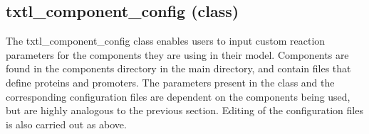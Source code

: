\documentclass[english]{report}
\begin{document}
		
		
		\subsection*{txtl\_component\_config (class)}	
		The txtl\_component\_config class enables users to input custom reaction parameters for the components they are using in their model. Components are found in the \textsf{components} directory in the main directory, and contain files that define proteins and promoters. The parameters present in the class and the corresponding configuration files are dependent on the components being used, but are highly analogous to the previous section. Editing of the configuration files is also carried out as above. 

\end{document}
